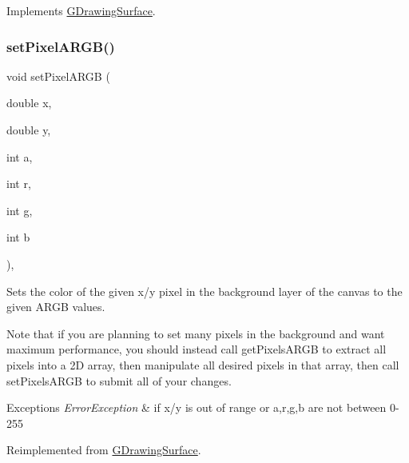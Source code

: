 Implements \mbox{\hyperlink{classsgl_1_1GDrawingSurface_ab2f7c5a9462f552ad3f30d23c04605dd}{G\+Drawing\+Surface}}.

\mbox{\label{classsgl_1_1GCanvas_a2d22778c4fdce45bb2df60518000c5ad}} 
\subsubsection{\texorpdfstring{set\+Pixel\+A\+R\+G\+B()}{setPixelARGB()}\hspace{0.1cm}{\footnotesize\ttfamily [2/2]}}
{\footnotesize\ttfamily void set\+Pixel\+A\+R\+GB (\begin{DoxyParamCaption}\item[{double}]{x,  }\item[{double}]{y,  }\item[{int}]{a,  }\item[{int}]{r,  }\item[{int}]{g,  }\item[{int}]{b }\end{DoxyParamCaption})\hspace{0.3cm}{\ttfamily [override]}, {\ttfamily [virtual]}}



Sets the color of the given x/y pixel in the background layer of the canvas to the given A\+R\+GB values. 

Note that if you are planning to set many pixels in the background and want maximum performance, you should instead call get\+Pixels\+A\+R\+GB to extract all pixels into a 2D array, then manipulate all desired pixels in that array, then call set\+Pixels\+A\+R\+GB to submit all of your changes.


\begin{DoxyExceptions}{Exceptions}
{\em Error\+Exception} & if x/y is out of range or a,r,g,b are not between 0-\/255 \\
\hline
\end{DoxyExceptions}


Reimplemented from \mbox{\hyperlink{classsgl_1_1GDrawingSurface_a62a8b1555ae3a073a84b0a1c071c65b1}{G\+Drawing\+Surface}}.

\mbox{\label{classsgl_1_1GCanvas_a9c29e6db2b5cae836612d932f7ef7146}} 
